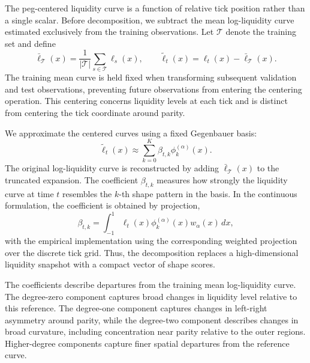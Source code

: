 \documentclass[a4paper,fleqn]{cas-sc}
\begin{document}
The peg-centered liquidity curve is a function of relative tick position
rather than a single scalar. Before decomposition, we subtract the mean
log-liquidity curve estimated exclusively from the training observations.
Let $\mathcal{T}$ denote the training set and define
\begin{equation}
\bar{\ell}_{\mathcal{T}}(x)
=
\frac{1}{|\mathcal{T}|}
\sum_{s\in\mathcal{T}}\ell_s(x),
\qquad
\widetilde{\ell}_t(x)
=
\ell_t(x)-\bar{\ell}_{\mathcal{T}}(x).
\end{equation}
The training mean curve is held fixed when transforming subsequent
validation and test observations, preventing future observations from
entering the centering operation. This centering concerns liquidity
levels at each tick and is distinct from centering the tick coordinate
around parity.

We approximate the centered curves using a fixed Gegenbauer basis:
\begin{equation}
\widetilde{\ell}_t(x)
\approx
\sum_{k=0}^{K}
\beta_{t,k}\phi_k^{(\alpha)}(x).
\end{equation}
The original log-liquidity curve is reconstructed by adding
$\bar{\ell}_{\mathcal{T}}(x)$ to the truncated expansion. The coefficient \(\beta_{t,k}\) measures how strongly the liquidity curve at time \(t\) resembles the \(k\)-th shape pattern in the basis. In the continuous formulation, the coefficient is obtained by projection,
\begin{equation}
\beta_{t,k}
=
\int_{-1}^{1}
\ell_t(x)\phi_k^{(\alpha)}(x)w_\alpha(x)\,dx,
\end{equation} with the empirical implementation using the corresponding weighted projection over the discrete tick grid. Thus, the decomposition replaces a high-dimensional liquidity snapshot with a compact vector of shape scores.

The coefficients describe departures from the training mean
log-liquidity curve. The degree-zero component captures broad changes
in liquidity level relative to this reference. The degree-one component
captures changes in left-right asymmetry around parity, while the
degree-two component describes changes in broad curvature, including
concentration near parity relative to the outer regions. Higher-degree
components capture finer spatial departures from the reference curve.
\end{document}

